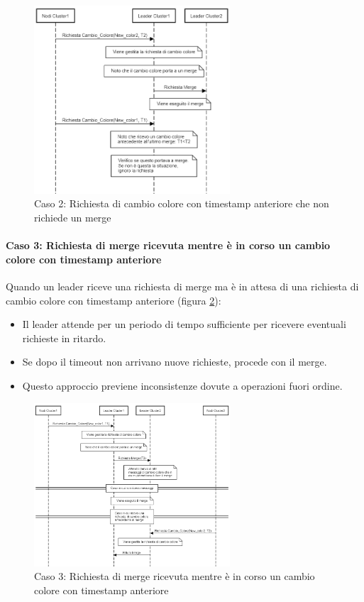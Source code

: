 \documentclass[12pt, a4paper]{report}
\begin{document}
\begin{figure}[H]
    \centering
    \includegraphics[width=0.65\textwidth,align=t]{images/concorrenza/caso2.png}
    \caption{Caso 2: Richiesta di cambio colore con timestamp anteriore che non richiede un merge}
    \label{fig:caso2_concorrenza}
\end{figure}

\newpage
\paragraph{Caso 3: Richiesta di merge ricevuta mentre \`e in corso un cambio colore con timestamp anteriore}

Quando un leader riceve una richiesta di merge ma \`e in attesa di una richiesta di cambio colore con timestamp anteriore (figura \ref{fig:caso3_concorrenza}):

\begin{itemize}
    \item Il leader attende per un periodo di tempo sufficiente per ricevere eventuali richieste in ritardo.
    \item Se dopo il timeout non arrivano nuove richieste, procede con il merge.
    \item Questo approccio previene inconsistenze dovute a operazioni fuori ordine.
\end{itemize}

\begin{figure}[H]
    \centering
    \includegraphics[width=0.65\textwidth,align=t]{images/concorrenza/caso3.png}
    \caption{Caso 3: Richiesta di merge ricevuta mentre \`e in corso un cambio colore con timestamp anteriore}
    \label{fig:caso3_concorrenza}
\end{figure}
\end{document}
